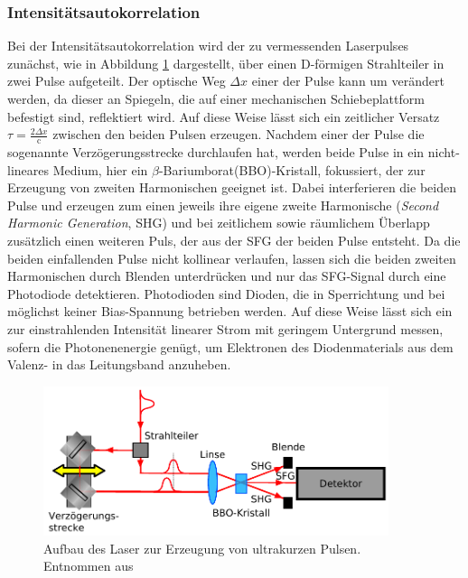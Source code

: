       \subsubsection{Intensitätsautokorrelation}  
        Bei der Intensitätsautokorrelation wird der zu vermessenden Laserpulses zunächst, wie in Abbildung \ref{fig:autokorrelator} dargestellt, über einen D-förmigen Strahlteiler in zwei Pulse aufgeteilt. 
        Der optische Weg $\Delta x$ einer der Pulse kann um  verändert werden, da dieser an Spiegeln, die auf einer mechanischen Schiebeplattform befestigt sind, reflektiert wird. Auf diese Weise lässt sich 
        ein zeitlicher Versatz $\tau=\frac{2\Delta x}{\text{c}}$ zwischen den beiden Pulsen erzeugen. Nachdem einer der Pulse die sogenannte Verzögerungsstrecke durchlaufen hat, werden beide Pulse in ein 
        nicht-lineares Medium, hier ein 
        $\beta$-Bariumborat(BBO)-Kristall, fokussiert, der zur Erzeugung von zweiten Harmonischen geeignet ist. Dabei interferieren die beiden Pulse und erzeugen zum einen jeweils ihre eigene zweite Harmonische 
        (\textit{Second Harmonic Generation}, SHG) und bei zeitlichem sowie räumlichem Überlapp zusätzlich einen weiteren Puls, der aus der SFG der beiden Pulse entsteht. Da die beiden einfallenden Pulse nicht 
        kollinear verlaufen, lassen sich die beiden zweiten Harmonischen durch Blenden unterdrücken und nur das SFG-Signal durch eine Photodiode detektieren. Photodioden sind Dioden, die in Sperrichtung und 
        bei möglichst keiner Bias-Spannung betrieben werden. Auf diese Weise lässt sich ein zur einstrahlenden Intensität linearer Strom mit geringem Untergrund messen, sofern die Photonenenergie genügt, um
        Elektronen des Diodenmaterials aus dem Valenz- in das Leitungsband anzuheben.  
        \FloatBarrier
        \begin{figure}[h]
          \centering
          \includegraphics[width = 0.9\textwidth]{pictures/autokorrelator.pdf}
          \caption{Aufbau des Laser zur Erzeugung von ultrakurzen Pulsen. Entnommen aus \cite{tu_dortmund_versuchsanleitung_nodate}}
          \label{fig:autokorrelator}
        \end{figure}

